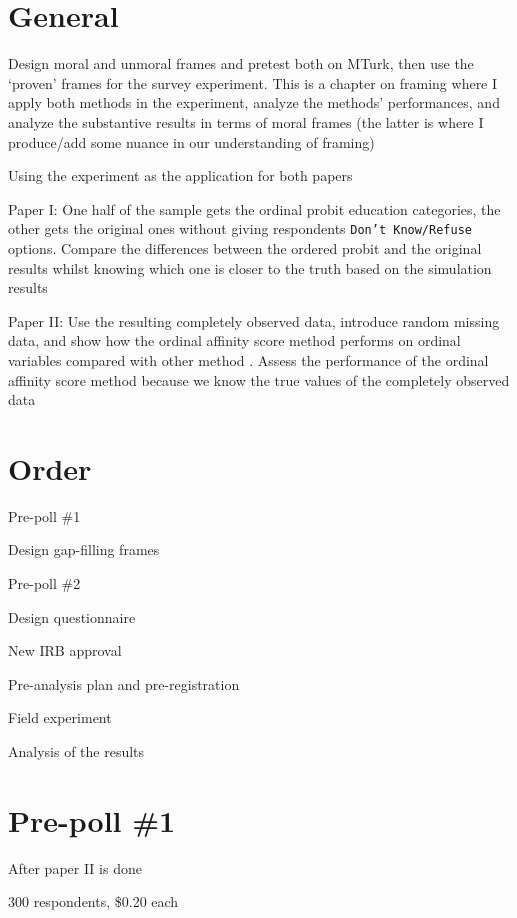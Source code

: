 \section*{General}
	\begin{coi}
		\item Design moral and unmoral frames and pretest both on MTurk, then use the `proven' frames for the survey experiment. This is a chapter on framing where I apply both methods in the experiment, analyze the methods' performances, and analyze the substantive results in terms of moral frames (the latter is where I produce/add some nuance in our understanding of framing)
		\item Using the experiment as the application for both papers
			\begin{coi}
				\item Paper I: One half of the sample gets the ordinal probit education categories, the other gets the original ones without giving respondents \texttt{Don't Know/Refuse} options. Compare the differences between the ordered probit and the original results whilst knowing which one is closer to the truth based on the simulation results
				\item Paper II: Use the resulting completely observed data, introduce random missing data, and show how the ordinal affinity score method performs on ordinal variables compared with other method	. Assess the performance of the ordinal affinity score method because we know the true values of the completely observed data
			\end{coi}
	\end{coi}	
		

\section*{Order}
	\begin{coi}
		\item Pre-poll \#1
		\item Design gap-filling frames
		\item Pre-poll \#2
		\item Design questionnaire
		\item New IRB approval
		\item Pre-analysis plan and pre-registration
		\item Field experiment
		\item Analysis of the results
	\end{coi}

\section*{Pre-poll \#1}
	\begin{coi}
		\item After paper II is done
		\item 300 respondents, \$0.20 each
	\end{coi}

